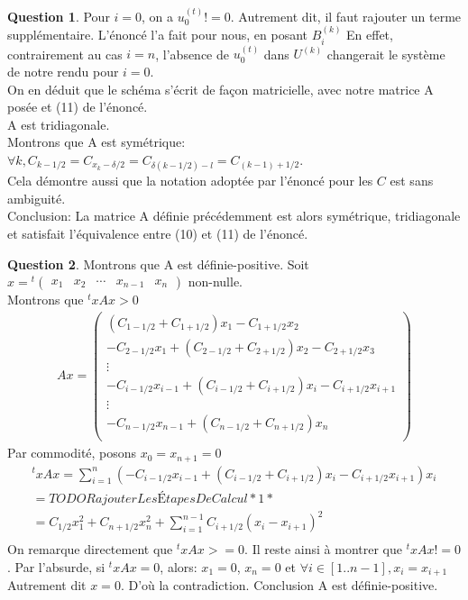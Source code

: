 \documentclass[a4paper]{article}
\theoremstyle{definition}
\newtheorem{que}{Question}
\begin{document}
\begin{que}
		Pour $i = 0$, on a $u_0^{(t)} != 0$. Autrement dit, il faut rajouter un terme supplémentaire.
		L'énoncé l'a fait pour nous, en posant $B_i^{(k)}$
		En effet, contrairement au cas $i=n$, l'absence de $u_0^{(t)}$ dans $U^{(k)}$ changerait le système de notre rendu pour $i=0$. \\

		On en déduit que le schéma s'écrit de façon matricielle, avec notre matrice A posée et (11) de l'énoncé. \\

		A est tridiagonale. \\

		Montrons que A est symétrique: $\forall k, C_{k-1/2} = C_{x_k - \delta / 2} = C_{\delta (k - 1/2) - l} = C_{(k-1)+1/2}$. \\
		Cela démontre aussi que la notation adoptée par l'énoncé pour les $C$ est sans ambiguité. \\

		Conclusion: La matrice A définie précédemment est alors symétrique, tridiagonale et satisfait l'équivalence entre (10) et (11) de l'énoncé. \\
	\end{que}
	\begin{que}
		Montrons que A est définie-positive.
		Soit $ x = {}^t \begin{pmatrix} x_1 & x_2 & \cdots & x_{n-1} & x_n \end{pmatrix}$ non-nulle. \\
		Montrons que ${}^txAx > 0$
		\begin{align*}
			Ax=
			\begin{pmatrix}
				(C_{1-1/2} + C_{1+1/2}) x_1 - C_{1+1/2} x_2 \\
				 - C_{2-1/2} x_1 + (C_{2-1/2} + C_{2+1/2}) x_2 - C_{2+1/2} x_3 \\
				\vdots \\
				- C_{i-1/2} x_{i-1} + (C_{i-1/2} + C_{i+1/2}) x_i - C_{i+1/2} x_{i+1} \\
				\vdots \\
				- C_{n-1/2} x_{n-1} + (C_{n-1/2} + C_{n+1/2}) x_n \\
			\end{pmatrix}
		\end{align*}
		Par commodité, posons $ x_0 = x_{n+1} = 0$
		\begin{align*}
			{}^txAx=\sum_{i=1}^n (- C_{i-1/2} x_{i-1} + (C_{i-1/2} + C_{i+1/2}) x_i - C_{i+1/2} x_{i+1}) x_i \\
			= TODO Rajouter Les Étapes De Calcul *1* \\
			= C_{1/2} x_1^2 + C_{n+1/2} x_n^2 + \sum_{i=1}^{n-1} C_{i+1/2} (x_i - x_{i+1})^2 \\
		\end{align*}
		On remarque directement que ${}^txAx >= 0$.
		Il reste ainsi à montrer que ${}^txAx != 0$.
		Par l'absurde, si ${}^txAx=0$, alors:
		$x_1 = 0$, $x_n = 0$ et $\forall i \in [1..n-1], x_i = x_{i+1}$
		Autrement dit $x = 0$. D'où la contradiction.
		Conclusion A est définie-positive.
	\end{que}
\end{document}
